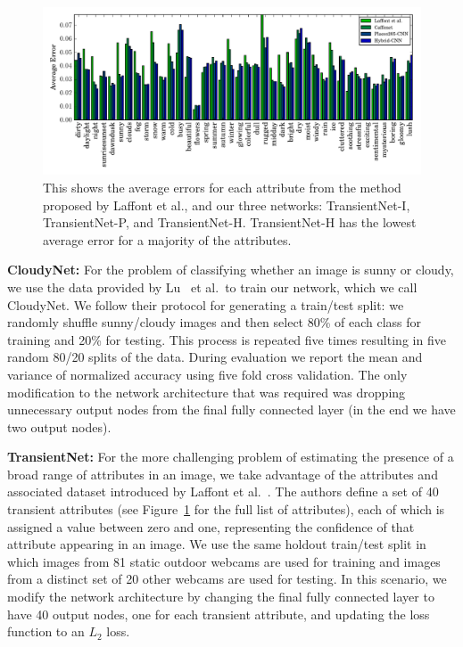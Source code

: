 \documentclass[10pt,twocolumn,letterpaper]{article}
\newcommand{\figref}[1]{Figure~\ref{fig:#1}}
\begin{document}
\begin{figure}[t!]
	\centering
		\includegraphics[width=1.0\textwidth, trim= 0 4mm 0 0]{figs/avg_err_compare.pdf}
		\caption{This shows the average errors for each attribute from the method proposed
						 by Laffont et al., and our three networks: TransientNet-I, TransientNet-P,
             and TransientNet-H.  TransientNet-H has the lowest average error for a 
             majority of the attributes.}
		\label{fig:compare}
\end{figure}

\textbf{CloudyNet:} For the problem of classifying whether an image is sunny or
cloudy, we use the data provided by Lu~\cite{lutwoclass} et al.\ to train our
network, which we call CloudyNet.  We follow their protocol for
generating a train/test split: we randomly shuffle sunny/cloudy images
and then select 80\% of each class for training and 20\% for testing.
This process is repeated five times resulting in five random 80/20
splits of the data. During evaluation we report the mean and variance
of normalized accuracy using five fold cross validation. The only
modification to the network architecture that was required was
dropping unnecessary output nodes from the final fully connected layer
(in the end we have two output nodes).

\textbf{TransientNet:} For the more challenging problem of estimating
the presence of a broad range of attributes in an image, we take
advantage of the attributes and associated dataset introduced by Laffont
et al.~\cite{Laffont14}. The authors define a set of 40 transient attributes
(see \figref{compare} for the full list of attributes), each of which is
assigned a value between zero and one, representing the confidence
of that attribute appearing in an image. We use the same holdout
train/test split in which images from 81 static outdoor webcams are
used for training and images from a distinct set of 20 other webcams are
used for testing.  In this scenario, we modify the network architecture
by changing the final fully connected layer to have 40 output nodes, one for
each transient attribute, and updating the loss function to an $L_2$
loss. 
\end{document}

